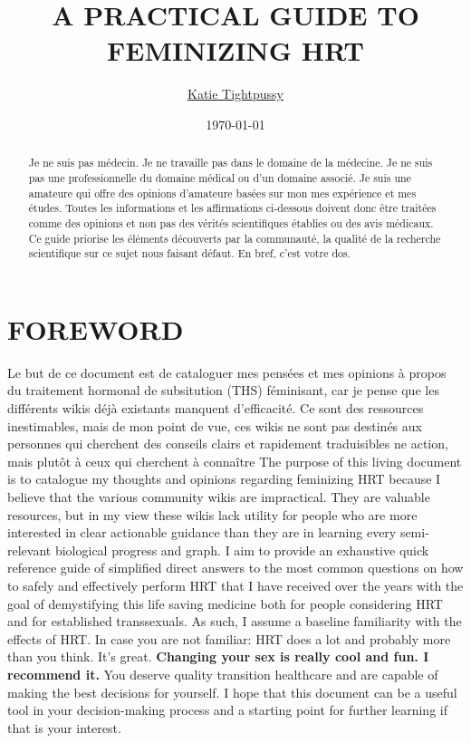 \documentclass{article}
\title{A PRACTICAL GUIDE TO FEMINIZING HRT}
\author{\href{https://katea.gay/}{Katie Tightpussy}}
\date{\today}
\begin{document}
\maketitle
\tableofcontents
\begin{abstract}
  Je ne suis pas médecin. Je ne travaille pas dans le domaine de la médecine. Je ne suis pas une professionnelle du domaine médical ou d'un domaine associé. Je suis une amateure qui offre des opinions d'amateure basées sur mon mes expérience et mes études. Toutes les informations et les affirmations ci-dessous doivent donc être traitées comme des opinions et non pas des vérités scientifiques établies ou des avis médicaux. Ce guide priorise les éléments découverts par la communauté, la qualité de la recherche scientifique sur ce sujet nous faisant défaut. En bref, c'est votre dos.
\end{abstract}


\section{FOREWORD}

Le but de ce document est de cataloguer mes pensées et mes opinions à propos du traitement hormonal de subsitution (THS) féminisant, car je pense que les différents wikis déjà existants manquent d'efficacité. Ce sont des ressources inestimables, mais de mon point de vue, ces wikis ne sont pas destinés aux personnes qui cherchent des conseils clairs et rapidement traduisibles ne action, mais plutôt à ceux qui cherchent à connaître
The purpose of this living document is to catalogue my thoughts and opinions regarding feminizing HRT because I believe that the various community wikis are impractical. They are valuable resources, but in my view these wikis lack utility for people who are more interested in clear actionable guidance than they are in learning every semi-relevant biological progress and graph. I aim to provide an exhaustive quick reference guide of simplified direct answers to the most common questions on how to safely and effectively perform HRT that I have received over the years with the goal of demystifying this life saving medicine both for people considering HRT and for established transsexuals. As such, I assume a baseline familiarity with the effects of HRT. In case you are not familiar: HRT does a lot and probably more than you think. It’s great. \textbf{Changing your sex is really cool and fun. I recommend it.} You deserve quality transition healthcare and are capable of making the best decisions for yourself. I hope that this document can be a useful tool in your decision-making process and a starting point for further learning if that is your interest.
\end{document}
